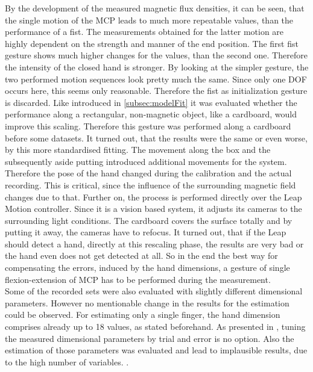 By the development of the measured magnetic flux densities, it can be seen, that the single motion of the \ac{MCP} leads to much more repeatable values, than the performance of a fist. The measurements obtained for the latter motion are highly dependent on the strength and manner of the end position. The first fist gesture shows much higher changes for the values, than the second one. Therefore the intensity of the closed hand is stronger. By looking at the simpler gesture, the two performed motion sequences look pretty much the same. Since only one \ac{DOF} occurs here, this seems only reasonable. Therefore the fist as initialization gesture is discarded. Like introduced in \ref{subsec:modelFit} it was evaluated whether the performance along a rectangular, non-magnetic object, like a cardboard, would improve this scaling. Therefore this gesture was performed along a cardboard before some datasets. It turned out, that the results were the same or even worse, by this more standardised fitting. The movement along the box and the subsequently aside putting introduced additional movements for the system. Therefore the pose of the hand changed during the calibration and the actual recording. This is critical, since the influence of the surrounding magnetic field changes due to that. Further on, the process is performed directly over the Leap Motion controller. Since it is a vision based system, it adjusts its cameras to the surrounding light conditions. The cardboard covers the surface totally and by putting it away, the cameras have to refocus. It turned out, that if the Leap should detect a hand, directly at this rescaling phase, the results are very bad or the hand even does not get detected at all. So in the end the best way for compensating the errors, induced by the hand dimensions, a gesture of single flexion-extension of \ac{MCP} has to be performed during the measurement.\\
Some of the recorded sets were also evaluated with slightly different dimensional parameters. However no mentionable change in the results for the estimation could be observed. For estimating only a single finger, the hand dimension comprises already up to 18 values, as stated beforehand. As presented in , tuning the measured dimensional parameters by trial and error is no option. Also the estimation of those parameters was evaluated and lead to implausible results, due to the high number of variables. . 

